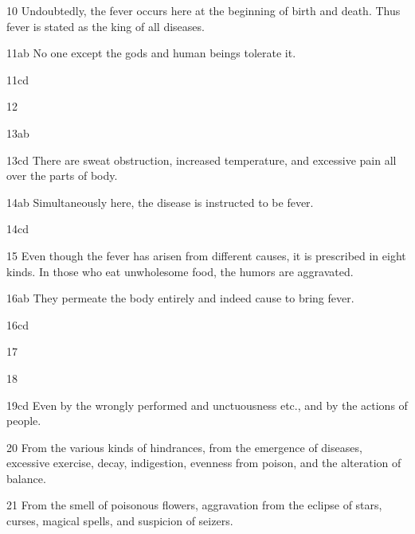 \begin{translation}
    \item[10] Undoubtedly, the fever occurs here at the beginning of birth and
    death. Thus fever is stated as the king of all diseases.
    
    
    \item[11ab] No one except the gods and human beings tolerate it.
    
    \item[11cd]  
    
    \item[12]  
    
    \item[13ab]  
    
    \item[13cd] There are sweat obstruction, increased temperature, and 
excessive
    pain all over the parts of body.
    
    
    \item[14ab] Simultaneously here, the disease is instructed to be fever.
    
   \item[14cd]  
    
    \item[15] Even though the fever has arisen from different causes, it is
    prescribed in eight kinds. In those who eat unwholesome food, the humors
    are aggravated.
    
    \item[16ab] They permeate the body entirely and indeed cause to bring 
fever.
    
   \item[16cd]  
    
   \item[17]  
    
   \item[18]  
    
    \item[19cd] Even by the wrongly performed and unctuousness etc., and by 
the
    actions of people.
    
    \item[20] From the various kinds of hindrances, from the emergence of
    diseases, excessive exercise, decay, indigestion, evenness from poison,
    and the alteration of balance.
    
    
    \item[21] From the smell of poisonous flowers, aggravation from the eclipse 
of
    stars, curses, magical spells, and suspicion of seizers.
    

\end{translation}
